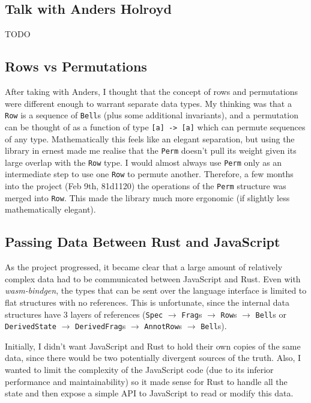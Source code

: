 \documentclass[12pt]{article}
\begin{document}
\subsection{Talk with Anders Holroyd}

TODO

\subsection{Rows vs Permutations}

After taking with Anders, I thought that the concept of rows and permutations were different enough
to warrant separate data types.  My thinking was that a \verb|Row| is a sequence of \verb|Bell|s
(plus some additional invariants), and a permutation can be thought of as a function of type
\verb|[a] -> [a]| which can permute sequences of any type.  Mathematically this feels like an
elegant separation, but using the library in ernest made me realise that the \verb|Perm| doesn't
pull its weight given its large overlap with the \verb|Row| type.  I would almost always use
\verb|Perm| only as an intermediate step to use one \verb|Row| to permute another.  Therefore, a few
months into the project (Feb 9th, 81d1120) the operations of the \verb|Perm| structure was merged
into \verb|Row|.  This made the library much more ergonomic (if slightly less mathematically
elegant).

\subsection{Passing Data Between Rust and JavaScript}

As the project progressed, it became clear that a large amount of relatively complex data had to be
communicated between JavaScript and Rust.  Even with \emph{wasm-bindgen}, the types that can be sent
over the language interface is limited to flat structures with no references.  This is unfortunate,
since the internal data structures have 3 layers of references (\verb|Spec| $\to$ \verb|Frag|s $\to$
\verb|Row|s $\to$ \verb|Bell|s or \verb|DerivedState| $\to$ \verb|DerivedFrag|s $\to$
\verb|AnnotRow|s $\to$ \verb|Bell|s).

Initially, I didn't want JavaScript and Rust to hold their own copies of the same data, since there
would be two potentially divergent sources of the truth.  Also, I wanted to limit the complexity of
the JavaScript code (due to its inferior performance and maintainability) so it made sense for Rust
to handle all the state and then expose a simple API to JavaScript to read or modify this data.
\end{document}
